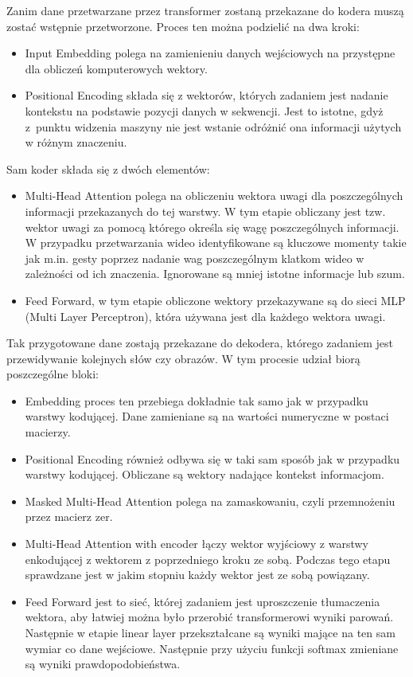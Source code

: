 \documentclass[12pt,a4paper,oneside]{book}
\begin{document}
Zanim dane przetwarzane przez transformer zostaną przekazane do kodera muszą zostać wstępnie przetworzone. Proces ten można podzielić na dwa kroki:
\begin{itemize}
    \item Input Embedding polega na zamienieniu danych wejściowych na przystępne dla obliczeń komputerowych wektory.
    \item Positional Encoding składa się z wektorów, których zadaniem jest nadanie kontekstu na podstawie pozycji danych w sekwencji. Jest to istotne, gdyż z~punktu widzenia maszyny nie jest wstanie odróżnić ona informacji użytych w różnym znaczeniu. 
\end{itemize}
Sam koder składa się z dwóch elementów:
\begin{itemize}
    \item Multi-Head Attention polega na obliczeniu wektora uwagi dla poszczególnych informacji przekazanych do tej warstwy. W tym etapie obliczany jest tzw. wektor uwagi za pomocą którego określa się wagę poszczególnych informacji. W przypadku przetwarzania wideo identyfikowane są kluczowe momenty takie jak m.in. gesty poprzez nadanie wag poszczególnym klatkom wideo w zależności od ich znaczenia. Ignorowane są mniej istotne informacje lub szum.
    \item Feed Forward, w tym etapie obliczone wektory przekazywane są do sieci MLP (Multi Layer Perceptron), która używana jest dla każdego wektora uwagi.
\end{itemize}
Tak przygotowane dane zostają przekazane do dekodera, którego zadaniem jest przewidywanie kolejnych słów czy obrazów. W tym procesie udział biorą poszczególne bloki:
\begin{itemize}
    \item Embedding proces ten przebiega dokładnie tak samo jak w przypadku warstwy kodującej. Dane zamieniane są na wartości numeryczne w postaci macierzy.
    \item Positional Encoding również odbywa się w taki sam sposób jak w przypadku warstwy kodującej. Obliczane są wektory nadające kontekst informacjom.
    \item Masked Multi-Head Attention polega na zamaskowaniu, czyli przemnożeniu przez macierz zer.
    \item Multi-Head Attention with encoder łączy wektor wyjściowy z warstwy enkodującej z wektorem z poprzedniego kroku ze sobą. Podczas tego etapu sprawdzane jest w jakim stopniu każdy wektor jest ze sobą powiązany.
    \item Feed Forward jest to sieć, której zadaniem jest uproszczenie tłumaczenia wektora, aby łatwiej można było przerobić transformerowi wyniki parowań. Następnie w etapie linear layer przekształcane są wyniki mające na ten sam wymiar co dane wejściowe. Następnie przy użyciu funkcji softmax zmieniane są wyniki prawdopodobieństwa.
\end{itemize}
\end{document}
